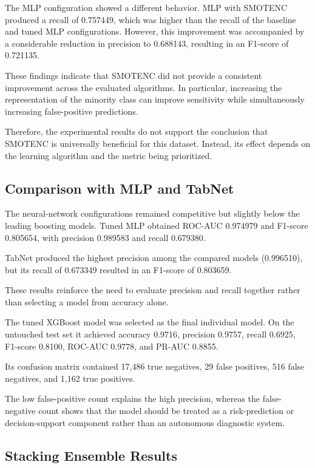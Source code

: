 \documentclass[conference]{IEEEtran}
\begin{document}
The MLP configuration showed a different behavior. MLP with SMOTENC produced a recall of 0.757449, which was higher than the recall of the baseline and tuned MLP configurations. However, this improvement was accompanied by a considerable reduction in precision to 0.688143, resulting in an F1-score of 0.721135.

These findings indicate that SMOTENC did not provide a consistent improvement across the evaluated algorithms. In particular, increasing the representation of the minority class can improve sensitivity while simultaneously increasing false-positive predictions.

Therefore, the experimental results do not support the conclusion that SMOTENC is universally beneficial for this dataset. Instead, its effect depends on the learning algorithm and the metric being prioritized.

\subsection{Comparison with MLP and TabNet}

The neural-network configurations remained competitive but slightly below the leading boosting models. Tuned MLP obtained ROC-AUC 0.974979 and F1-score 0.805654, with precision 0.989583 and recall 0.679380.

TabNet produced the highest precision among the compared models (0.996510), but its recall of 0.673349 resulted in an F1-score of 0.803659.

These results reinforce the need to evaluate precision and recall together rather than selecting a model from accuracy alone.

The tuned XGBoost model was selected as the final individual model. On the untouched test set it achieved accuracy 0.9716, precision 0.9757, recall 0.6925, F1-score 0.8100, ROC-AUC 0.9778, and PR-AUC 0.8855.

Its confusion matrix contained 17,486 true negatives, 29 false positives, 516 false negatives, and 1,162 true positives.

The low false-positive count explains the high precision, whereas the false-negative count shows that the model should be treated as a risk-prediction or decision-support component rather than an autonomous diagnostic system.

\subsection{Stacking Ensemble Results}
\end{document}
